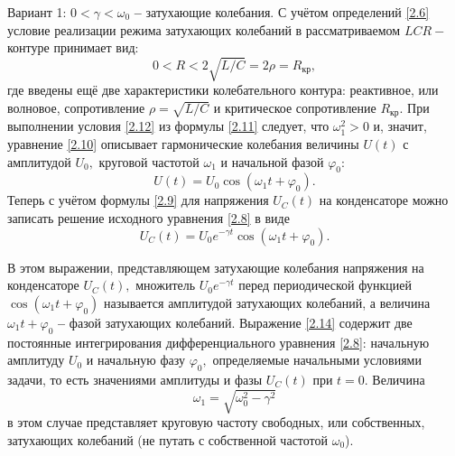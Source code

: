 \textsf{Вариант 1:} $0<\gamma<\omega_0$ \textbf{--} \textsf{затухающие колебания.} С учётом определений \eqref{2.6} условие реали\-зации режима затухающих колебаний в рассматриваемом $LCR-$контуре принимает вид:
\begin{equation}\label{2.12}
0<R<2\sqrt{L/C}=2\rho=R_{\text{кр}},
\end{equation}
где введены ещё две характеристики колебательного контура: \textsf{реактивное,} или \textsf{волновое, со\-противление} $\rho=\sqrt{L/C}$ и \textsf{критическое сопротивление} $R_{\text{кр}}$. При выполнении условия \eqref{2.12} из формулы \eqref{2.11} следует, что $\omega_1^2>0$ и, значит, уравнение \eqref{2.10} описывает гармонические колебания величины $U(t)$ с амплитудой $U_0,$ круговой частотой $\omega_1$ и начальной фазой $\varphi_0$:
\begin{equation}\label{2.13}
U(t)=U_0\cos(\omega_1t+\varphi_0).
\end{equation}
Теперь с учётом формулы \eqref{2.9} для напряжения $U_C(t)$ на конденсаторе можно записать реше\-ние исходного уравнения \eqref{2.8} в виде
\begin{equation}\label{2.14}
U_C(t)=U_0e^{-\gamma t}\cos(\omega_1t+\varphi_0).
\end{equation}

В этом выражении, представляющем \textsf{затухающие колебания} напряжения на конденсаторе $U_C(t),$ множитель $U_0e^{-\gamma t}$ перед периодической функцией $\cos(\omega_1 t+\varphi_0)$ называется \textsf{амплиту\-дой затухающих колебаний,} а величина $\omega_1t+\varphi_0$ \textbf{--} \textsf{фазой затухающих колебаний.} Выражение \eqref{2.14} содержит две постоянные интегрирования дифференциального уравнения \eqref{2.8}: \textsf{началь\-ную амплитуду} $U_0$ и \textsf{начальную фазу} $\varphi_0,$ определяемые начальными условиями задачи, то есть значениями амплитуды и фазы $U_C(t)$ при $t=0.$ Величина
\begin{equation}\label{2.15}
\omega_1=\sqrt{\omega_0^2-\gamma^2}
\end{equation}
в этом случае представляет \textsf{круговую частоту свободных,} или \textsf{собственных, затухающих колебаний} (не путать с собственной частотой $\omega_0$).

